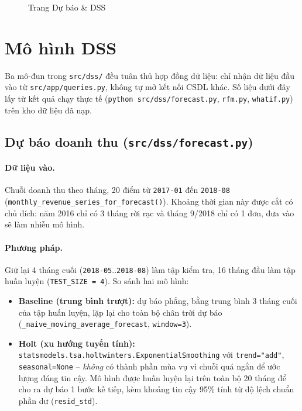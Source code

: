 \documentclass[12pt,a4paper]{article}
\newcommand{\code}[1]{\texttt{\small #1}}
\begin{document}
\begin{figure}[h]
\centering
{}
\caption{Trang Dự báo \& DSS}\label{fig:ss-dss}
\end{figure}

\section{Mô hình DSS}\label{sec:dss}

Ba mô-đun trong \code{src/dss/} đều tuân thủ hợp đồng dữ liệu: chỉ nhận dữ liệu đầu vào từ
\code{src/app/queries.py}, không tự mở kết nối CSDL khác. Số liệu dưới đây lấy từ kết quả chạy thực tế
(\code{python src/dss/forecast.py}, \code{rfm.py}, \code{whatif.py}) trên kho dữ liệu đã nạp.

\subsection{Dự báo doanh thu (\code{src/dss/forecast.py})}

\paragraph{Dữ liệu vào.} Chuỗi doanh thu theo tháng, 20 điểm từ \code{2017-01} đến \code{2018-08}
(\code{monthly\_revenue\_series\_for\_forecast()}). Khoảng thời gian này được cắt có chủ đích: năm 2016 chỉ
có 3 tháng rời rạc và tháng 9/2018 chỉ có 1 đơn, đưa vào sẽ làm nhiễu mô hình.

\paragraph{Phương pháp.} Giữ lại 4 tháng cuối (\code{2018-05}..\code{2018-08}) làm tập kiểm tra, 16 tháng đầu
làm tập huấn luyện (\code{TEST\_SIZE = 4}). So sánh hai mô hình:
\begin{itemize}[nosep]
  \item \textbf{Baseline (trung bình trượt):} dự báo phẳng, bằng trung bình 3 tháng cuối của tập huấn luyện,
        lặp lại cho toàn bộ chân trời dự báo (\code{\_naive\_moving\_average\_forecast}, \code{window=3}).
  \item \textbf{Holt (xu hướng tuyến tính):} \code{statsmodels.tsa.holtwinters.ExponentialSmoothing} với
        \code{trend="add"}, \code{seasonal=None} -- \emph{không} có thành phần mùa vụ vì chuỗi quá ngắn để
        ước lượng đáng tin cậy. Mô hình được huấn luyện lại trên toàn bộ 20 tháng để cho ra dự báo 1 bước kế
        tiếp, kèm khoảng tin cậy 95\% tính từ độ lệch chuẩn phần dư (\code{resid\_std}).
\end{itemize}
\end{document}

